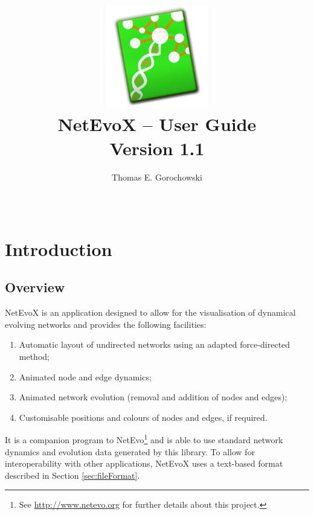 \documentclass[a4paper, 11pt]{article}
\begin{document}
\renewcommand\Affilfont{\itshape\fontsize{9}{11}\selectfont}
\title{\vspace{-1.2cm}\fontsize{22}{26}\selectfont\includegraphics[width=4.5cm]{./Figures/NetEvoX.pdf} \\ NetEvoX -- User Guide \\ \vspace{0.2cm} \fontsize{14}{16}\selectfont Version 1.1}
\author[1]{Thomas E. Gorochowski}
\date{~\vspace{-1.0cm}}
\maketitle
\tableofcontents
\newpage

\section{Introduction}

\subsection{Overview}
NetEvoX is an application designed to allow for the visualisation of dynamical evolving networks and provides the following facilities:
\begin{enumerate}
	\item Automatic layout of undirected networks using an adapted force-directed method;
	\item Animated node and edge dynamics;
	\item Animated network evolution (removal and addition of nodes and edges);
	\item Customisable positions and colours of nodes and edges, if required.
\end{enumerate}
It is a companion program to NetEvo\footnote{See \url{http://www.netevo.org} for further details about this project.} and is able to use standard network dynamics and evolution data generated by this library. To allow for interoperability with other applications, NetEvoX uses a text-based format described in Section \ref{sec:fileFormat}.
\end{document}

